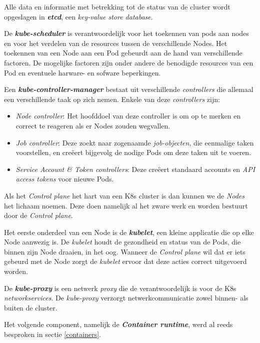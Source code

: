 Alle data en informatie met betrekking tot de status van de cluster wordt opgeslagen in \textbf{\textit{etcd}}, een \textit{key-value store database}.

De \textbf{\textit{kube-scheduler}} is verantwoordelijk voor het toekennen van pods aan nodes en voor het verdelen van de resources tussen de verschillende Nodes. Het toekennen van een Node aan een Pod gebeurdt aan de hand van verschillende factoren. De mogelijke factoren zijn onder andere de benodigde resources van een Pod en eventuele harware- en sofware beperkingen.

Een \textbf{\textit{kube-controller-manager}} bestaat uit verschillende \textit{controllers} die allemaal een verschillende taak op zich nemen. Enkele van deze \textit{controllers} zijn:
\begin{itemize}
    \item \textit{Node controller}: Het hoofddoel van deze controller is om op te merken en correct te reageren als er Nodes zouden wegvallen.
    \item \textit{Job controller}: Deze zoekt naar zogenaamde \textit{job-objecten}, die eenmalige taken voorstellen, en creëert bijgevolg de nodige Pods om deze taken uit te voeren.
    \item \textit{Service Account \& Token controllers}: Deze creëert standaard accounts en \textit{API access tokens} voor nieuwe Pods.
\end{itemize}

Als het \textit{Control plane} het hart van een K8s cluster is dan kunnen we de \textit{Nodes} het lichaam noemen. Deze doen namelijk al het zware werk en worden bestuurt door de \textit{Control plane}.

Het eerste onderdeel van een Node is de \textbf{\textit{kubelet}}, een kleine applicatie die op elke Node aanwezig is. De \textit{kubelet} houdt de gezondheid en status van de Pods, die binnen zijn Node draaien, in het oog. Wanneer de \textit{Control plane} wil dat er iets gebeurd met de Node zorgt de \textit{kubelet} ervoor dat deze acties correct uitgevoerd worden.

De \textbf{\textit{kube-proxy}} is een netwerk \textit{proxy} die de verantwoordelijk is voor de K8s \textit{networkservices}. De \textit{kube-proxy} verzorgt netwerkcommunicatie zowel binnen- als buiten de cluster.

Het volgende component, namelijk de \textbf{\textit{Container runtime}}, werd al reeds besproken in sectie \ref{containers}.

